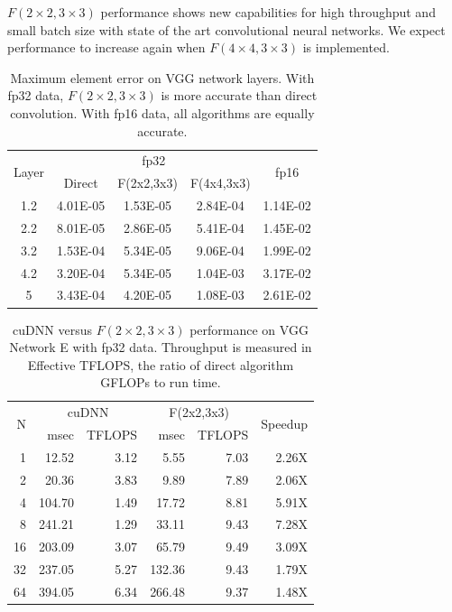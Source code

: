 \documentclass[10pt,twocolumn,letterpaper]{article}
\begin{document}
$F(2\times 2, 3\times 3)$ performance shows new capabilities for high throughput and small batch size with state of the art convolutional neural networks. We expect performance to increase again when $F(4\times 4, 3\times 3)$ is implemented.

\begin{table}
\begin{center}
\begin{tabular}{ |c|c c c|c| }
\hline
\multirow{2}{*}{Layer} & \multicolumn{3}{c|}{fp32} & \multirow{2}{*}{fp16}\\
 & Direct & F(2x2,3x3) & F(4x4,3x3) & \\
\hline
\hline
1.2 & 4.01E-05 & 1.53E-05 & 2.84E-04 & 1.14E-02\\
2.2 & 8.01E-05 & 2.86E-05 & 5.41E-04 & 1.45E-02\\
3.2 & 1.53E-04 & 5.34E-05 & 9.06E-04 & 1.99E-02\\
4.2 & 3.20E-04 & 5.34E-05 & 1.04E-03 & 3.17E-02\\
5 & 3.43E-04 & 4.20E-05 & 1.08E-03 & 2.61E-02\\
\hline
\end{tabular}
\end{center}
\caption{Maximum element error on VGG network layers. With fp32 data, $F(2 \times 2,3 \times 3)$ is more accurate than direct convolution. With fp16 data, all algorithms are equally accurate.}
\label{table:fp32-accuracy}
\end{table}

\begin{table}
\begin{center}
\begin{tabular}{|r | r r | r r | r|}
\hline
\multirow{2}{*}{N} & \multicolumn{2}{c|}{cuDNN} & \multicolumn{2}{c|}{F(2x2,3x3)} & \multirow{2}{*}{Speedup}\\
 & msec & TFLOPS & msec & TFLOPS & \\
\hline
\hline
  1 &   12.52 &     3.12 &     5.55 &     7.03 &     2.26X \\
  2 &   20.36 &     3.83 &     9.89 &     7.89 &     2.06X \\
  4 &  104.70 &     1.49 &    17.72 &     8.81 &     5.91X \\
  8 &  241.21 &     1.29 &    33.11 &     9.43 &     7.28X \\
 16 &  203.09 &     3.07 &    65.79 &     9.49 &     3.09X \\
 32 &  237.05 &     5.27 &   132.36 &     9.43 &     1.79X \\
 64 &  394.05 &     6.34 &   266.48 &     9.37 &     1.48X \\
\hline
\end{tabular}
\end{center}
\caption{cuDNN versus $F(2\times 2, 3\times 3)$ performance on VGG Network E with fp32 data. Throughput is measured in Effective TFLOPS, the ratio of direct algorithm GFLOPs to run time.}
\label{table:speed}
\end{table}
\end{document}
